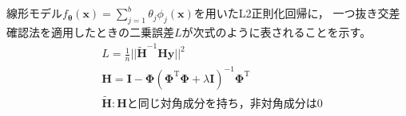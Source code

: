 \documentclass[class=jsarticle, crop=false, dvipdfmx, fleqn]{standalone}
\begin{document}
\section{}

線形モデル\(f_{\bm{\theta}} (\bm{x}) = \sum_{j=1}^b \theta_j \phi_j (\bm{x})\)を用いたL2正則化回帰に，
一つ抜き交差確認法を適用したときの二乗誤差\(L\)が次式のように表されることを示す。
\begin{align}
    & L = \frac{1}{n} ||\tilde{\bm{H}}^{-1} \bm{H} \bm{y}||^2 \\
    & \bm{H} = \bm{I} - \bm{\Phi} (\bm{\Phi}^\mathrm{T} \bm{\Phi} + \lambda \bm{I})^{-1} \bm{\Phi}^\mathrm{T} \\
    & \tilde{\bm{H}} : \text{\(\bm{H}\)と同じ対角成分を持ち，非対角成分は0}
\end{align}
\end{document}
